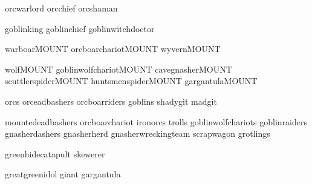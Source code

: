 

\vspace*{10pt}

{orcwarlord}
{orcchief}
{orcshaman}

\clearpage
{}
\vspace*{10pt}

{goblinking}
{goblinchief}
{goblinwitchdoctor}

\clearpage
{}

\vspace*{10pt}

{warboarMOUNT}
{orcboarchariotMOUNT}
{wyvernMOUNT}

\clearpage
{}
\vspace*{10pt}

{wolfMOUNT}
{goblinwolfchariotMOUNT}
{cavegnasherMOUNT}
{scuttlerspiderMOUNT}
{huntsmenspiderMOUNT}
{gargantulaMOUNT}

\clearpage
{}

{orcs}
{orceadbashers}
{orcboarriders}
{goblins}
{shadygit}
{madgit}

\clearpage
{}

{mountedeadbashers}
{orcboarchariot}
{ironorcs}
{trolls}
{goblinwolfchariots}
{goblinraiders}
{gnasherdashers}
{gnasherherd}
{gnasherwreckingteam}
{scrapwagon}
{grotlings}

\clearpage
{}

{greenhidecatapult}
{skewerer}

\clearpage
{}

{greatgreenidol}
{giant}
{gargantula}
